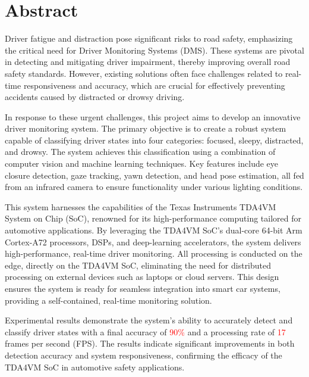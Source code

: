 \newpage
\section*{Abstract}


Driver fatigue and distraction pose significant risks to road safety, emphasizing the critical need for Driver Monitoring Systems (DMS). These systems are pivotal in detecting and mitigating driver impairment, thereby improving overall road safety standards. However, existing solutions often face challenges related to real-time responsiveness and accuracy, which are crucial for effectively preventing accidents caused by distracted or drowsy driving.

\vspace{\baselineskip}

In response to these urgent challenges, this project aims to develop an innovative driver monitoring system. The primary objective is to create a robust system capable of classifying driver states into four categories: focused, sleepy, distracted, and drowsy. The system achieves this classification using a combination of computer vision and machine learning techniques. Key features include eye closure detection, gaze tracking, yawn detection, and head pose estimation, all fed from an infrared camera to ensure functionality under various lighting conditions.

\vspace{\baselineskip}

This system harnesses the capabilities of the Texas Instruments TDA4VM System on Chip (SoC), renowned for its high-performance computing tailored for automotive applications. By leveraging the TDA4VM SoC's dual-core 64-bit Arm Cortex-A72 processors, DSPs, and deep-learning accelerators, the system delivers high-performance, real-time driver monitoring. All processing is conducted on the edge, directly on the TDA4VM SoC, eliminating the need for distributed processing on external devices such as laptops or cloud servers. This design ensures the system is ready for seamless integration into smart car systems, providing a self-contained, real-time monitoring solution.

\vspace{\baselineskip}

Experimental results demonstrate the system's ability to accurately detect and classify driver states with a final accuracy of \textcolor{red}{90\%} and a processing rate of \textcolor{red}{17} frames per second (FPS). The results indicate significant improvements in both detection accuracy and system responsiveness, confirming the efficacy of the TDA4VM SoC in automotive safety applications.

